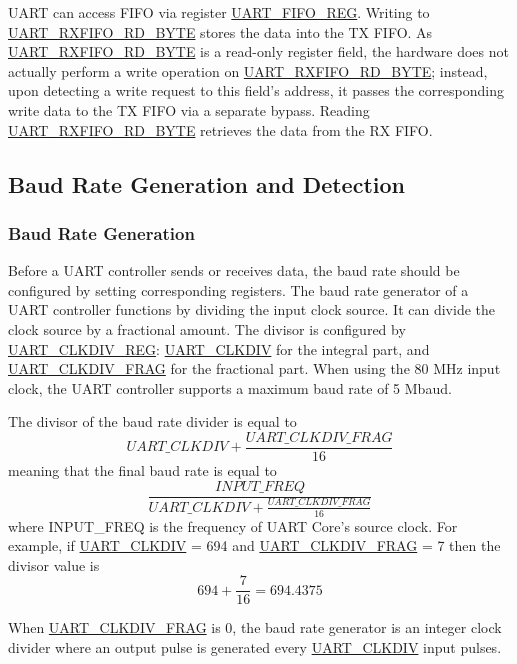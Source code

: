 \documentclass[main\_\_EN.tex]{subfiles}
\begin{document}
UART can access FIFO via register \hyperref[regdesc:UARTFIFOREG]{UART\_FIFO\_REG}. Writing to \hyperref[fielddesc:UARTRXFIFORDBYTE]{UART\_RXFIFO\_RD\_BYTE} stores the data into the TX FIFO. As \hyperref[fielddesc:UARTRXFIFORDBYTE]{UART\_RXFIFO\_RD\_BYTE} is a read-only register field, the hardware does not actually perform a write operation on \hyperref[fielddesc:UARTRXFIFORDBYTE]{UART\_RXFIFO\_RD\_BYTE}; instead, upon detecting a write request to this field's address, it passes the corresponding write data to the TX FIFO via a separate bypass. Reading \hyperref[fielddesc:UARTRXFIFORDBYTE]{UART\_RXFIFO\_RD\_BYTE} retrieves the data from the RX FIFO.

\subsection{Baud Rate Generation and Detection}

\subsubsection{Baud Rate Generation}

Before a UART controller sends or receives data, the baud rate should be configured by setting corresponding registers. The baud rate generator of a UART controller functions by dividing the input clock source. It can divide the clock source by a fractional amount. The divisor is configured by \hyperref[regdesc:UARTCLKDIVREG]{UART\_CLKDIV\_REG}: \hyperref[fielddesc:UARTCLKDIV]{UART\_CLKDIV} for the integral part, and \hyperref[fielddesc:UARTCLKDIVFRAG]{UART\_CLKDIV\_FRAG} for the fractional part. When using the 80 MHz input clock, the UART controller supports a maximum baud rate of 5 Mbaud.

The divisor of the baud rate divider is equal to
\[
    \hyperref[fielddesc:UARTCLKDIV]{UART\_CLKDIV} + \frac{\hyperref[fielddesc:UARTCLKDIVFRAG]{UART\_CLKDIV\_FRAG}}{16}
\]   
meaning that the final baud rate is equal to
\[
    \frac{INPUT\_FREQ}{\hyperref[fielddesc:UARTCLKDIV]{UART\_CLKDIV} + \frac{\hyperref[fielddesc:UARTCLKDIVFRAG]{UART\_CLKDIV\_FRAG}}{16}}
\]
where INPUT\_FREQ is the frequency of UART Core's source clock. For example, if \hyperref[fielddesc:UARTCLKDIV]{UART\_CLKDIV} = 694 and \hyperref[fielddesc:UARTCLKDIVFRAG]{UART\_CLKDIV\_FRAG} = 7
then the divisor value is
\[
    694 + \frac{7}{16} = 694.4375
\]


When \hyperref[fielddesc:UARTCLKDIVFRAG]{UART\_CLKDIV\_FRAG} is 0, the baud rate generator is an integer clock divider where an output pulse is generated every
\hyperref[fielddesc:UARTCLKDIV]{UART\_CLKDIV} input pulses.
\end{document}
